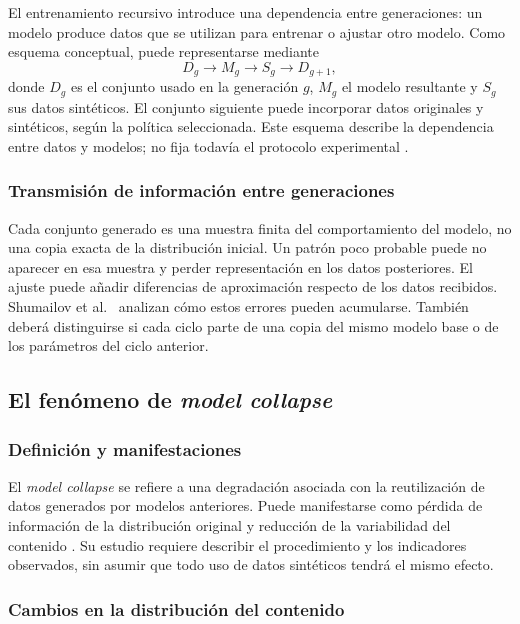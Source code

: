 \documentclass[12pt,letterpaper]{article}
\begin{document}
El entrenamiento recursivo introduce una dependencia entre generaciones:
un modelo produce datos que se utilizan para entrenar o ajustar otro modelo.
Como esquema conceptual, puede representarse mediante
\begin{equation}
    D_g \longrightarrow M_g \longrightarrow S_g
    \longrightarrow D_{g+1},
\end{equation}
donde \(D_g\) es el conjunto usado en la generación \(g\), \(M_g\) el modelo
resultante y \(S_g\) sus datos sintéticos. El conjunto siguiente puede
incorporar datos originales y sintéticos, según la política seleccionada.
Este esquema describe la dependencia entre datos y modelos; no fija todavía
el protocolo experimental \cite{shumailov2024,kazdan2025}.

\subsubsection{Transmisión de información entre generaciones}

Cada conjunto generado es una muestra finita del comportamiento del modelo,
no una copia exacta de la distribución inicial. Un patrón poco probable
puede no aparecer en esa muestra y perder representación en los datos
posteriores. El ajuste puede añadir diferencias de aproximación respecto
de los datos recibidos. Shumailov et al.\ \cite{shumailov2024} analizan cómo
estos errores pueden acumularse. También deberá distinguirse si cada ciclo
parte de una copia del mismo modelo base o de los parámetros del ciclo
anterior.

\subsection{El fenómeno de \textit{model collapse}}

\subsubsection{Definición y manifestaciones}

El \textit{model collapse} se refiere a una degradación asociada con la
reutilización de datos generados por modelos anteriores. Puede manifestarse
como pérdida de información de la distribución original y reducción de
la variabilidad del contenido \cite{shumailov2024}. Su estudio requiere
describir el procedimiento y los indicadores observados, sin asumir que
todo uso de datos sintéticos tendrá el mismo efecto.

\subsubsection{Cambios en la distribución del contenido}
\end{document}
